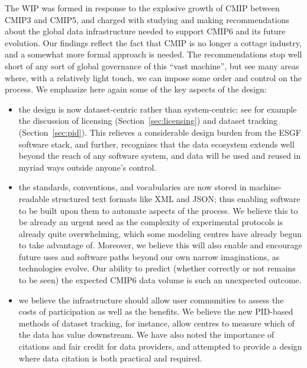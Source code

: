 \documentclass[gmd,manuscript]{copernicus}
\newcommand{\secref}[1] {\mbox{Section  \ref{sec:#1}}}
\begin{document}
\label{sec:summary}

The WIP was formed in response to the explosive growth of CMIP between
CMIP3 and CMIP5, and charged with studying and making recommendations
about the global data infrastructure needed to support CMIP6 and its
future evolution. Our findings reflect the fact that CMIP is no longer
a cottage industry, and a somewhat more formal approach is needed. The
recommendations stop well short of any sort of global governance of
this ``vast machine'', but see many areas where, with a relatively
light touch, we can impose some order and control on the process. We
emphasize here again some of the key aspects of the design:

\begin{itemize}
\item the design is now dataset-centric rather than system-centric:
  see for example the discussion of licensing (\secref{licensing}) and
  dataset tracking (\secref{pid}). This relieves a considerable design
  burden from the ESGF software stack, and further, recognizes that the
  data ecosystem extends well beyond the reach of any software system,
  and data will be used and reused in myriad ways outside anyone's
  control.
\item the standards, conventions, and vocabularies are now stored in
  machine-readable structured text formats like XML and JSON; thus
  enabling software to be built upon them to automate aspects of the
  process. We believe this to be already an urgent need as the
  complexity of experimental protocols is already quite overwhelming,
  which some modeling centres have already begun to take advantage of.
  Moreover, we believe this will also enable and encourage future uses
  and software paths beyond our own narrow imaginations, as
  technologies evolve. Our ability to predict (whether correctly or
  not remains to be seen) the expected CMIP6 data volume is such an
  unexpected outcome.
\item we believe the infrastructure should allow user communities to
  assess the costs of participation as well as the benefits. We
  believe the new PID-based methods of dataset tracking, for instance,
  allow centres to measure which of the data has value downstream. We
  have also noted the importance of citations and fair credit for data
  providers, and attempted to provide a design where data citation is
  both practical and required.
\end{itemize}
\end{document}
